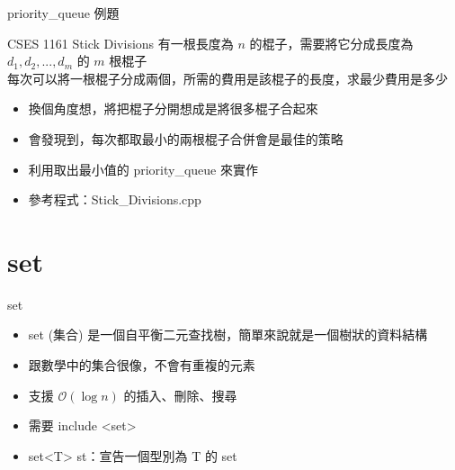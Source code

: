 \documentclass[aspectratio=169]{beamer}
\begin{document}
    \begin{frame}{priority\_queue 例題}
        \begin{block}{CSES 1161 Stick Divisions}
            有一根長度為 $n$ 的棍子，需要將它分成長度為 $d_1, d_2, ..., d_m$ 的 $m$ 根棍子\\
            每次可以將一根棍子分成兩個，所需的費用是該棍子的長度，求最少費用是多少
        \end{block}

        \begin{itemize}
            \item<2-> 換個角度想，將把棍子分開想成是將很多棍子合起來
            \item<3-> 會發現到，每次都取最小的兩根棍子合併會是最佳的策略
            \item<4-> 利用取出最小值的 priority\_queue 來實作
            \item<4-> 參考程式：Stick\_Divisions.cpp
        \end{itemize}
    \end{frame}

    \section{set}

    \begin{frame}{set}
        \begin{itemize}
            \item<1-> set (集合) 是一個自平衡二元查找樹，簡單來說就是一個樹狀的資料結構
            \item<1-> 跟數學中的集合很像，不會有重複的元素
            \item<2-> 支援 $\mathcal{O}(\log n)$ 的插入、刪除、搜尋
            \item<2-> 需要 include <set>
            \item<3-> set<T> st：宣告一個型別為 T 的 set
        \end{itemize}
    \end{frame}
\end{document}
